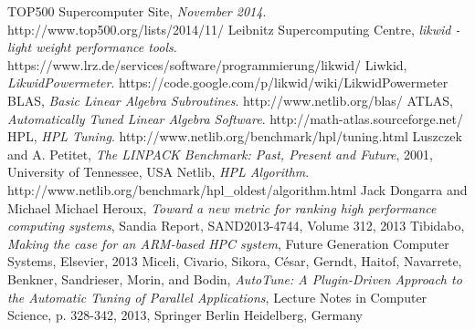 \documentclass[10pt,twocolumn]{article}
\begin{document}
\begin{thebibliography}{9}

  	TOP500 Supercomputer Site,
  	\emph{November 2014}.
  	http://www.top500.org/lists/2014/11/
	Leibnitz Supercomputing Centre,
	\emph{likwid - light weight performance tools}.
	https://www.lrz.de/services/software/programmierung/likwid/
	Liwkid,
	\emph{LikwidPowermeter}.
	https://code.google.com/p/likwid/wiki/LikwidPowermeter
	BLAS,
	\emph{Basic Linear Algebra Subroutines}.
	http://www.netlib.org/blas/
	ATLAS,
	\emph{Automatically Tuned Linear Algebra Software}.
	http://math-atlas.sourceforge.net/
	HPL,
	\emph{HPL Tuning}.
	http://www.netlib.org/benchmark/hpl/tuning.html
	Luszczek and A. Petitet,
	\emph{The LINPACK Benchmark: Past, Present and Future},
	2001, University of Tennessee, USA
	Netlib,
	\emph{HPL Algorithm}.
	http://www.netlib.org/benchmark/hpl\_oldest/algorithm.html
	Jack Dongarra and Michael Michael Heroux,
	\emph{Toward a new metric for ranking high performance computing systems},
	Sandia Report, SAND2013-4744, Volume 312, 2013
	Tibidabo,
	\emph{Making the case for an ARM-based HPC system},
	Future Generation Computer Systems, Elsevier, 2013
	Miceli, Civario, Sikora, César, Gerndt, Haitof, Navarrete, Benkner, Sandrieser, Morin, and Bodin,
	\emph{AutoTune: A Plugin-Driven Approach to the Automatic Tuning of Parallel Applications}, Lecture Notes in Computer Science, p. 328-342, 2013, Springer Berlin Heidelberg, Germany
\end{thebibliography}
\end{document}
